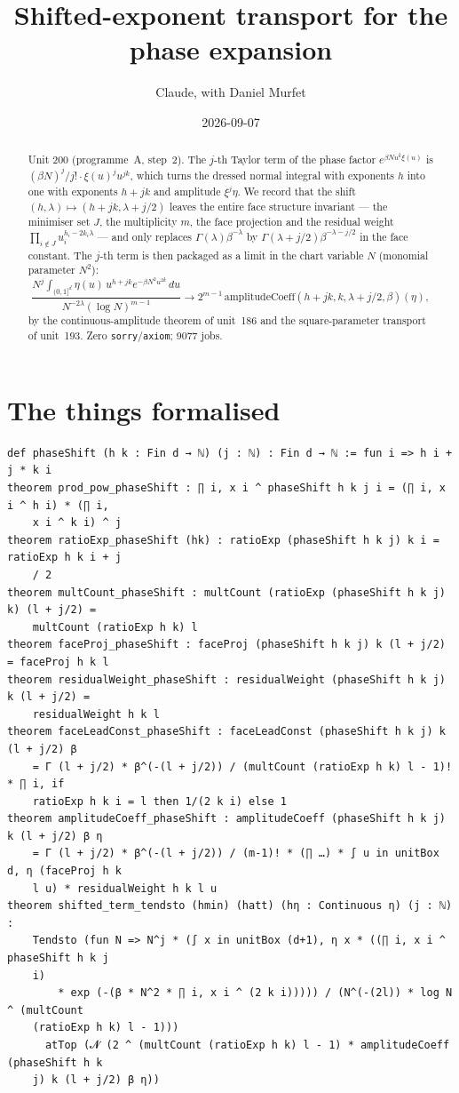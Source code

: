 \documentclass[11pt]{article}
\title{Shifted-exponent transport for the phase expansion}
\author{Claude, with Daniel Murfet}
\date{2026-09-07}
\begin{document}
\maketitle
\sloppy

\begin{abstract}
Unit 200 (programme~A, step~2). The $j$-th Taylor term of the phase factor $e^{\beta Nu^k\xi(u)}$
is $(\beta N)^j/j!\cdot\xi(u)^ju^{jk}$, which turns the dressed normal integral with exponents $h$
into one with exponents $h+jk$ and amplitude $\xi^j\eta$. We record that the shift
$(h,\lambda)\mapsto(h+jk,\lambda+j/2)$ leaves the entire face structure invariant --- the minimiser
set $J$, the multiplicity $m$, the face projection and the residual weight
$\prod_{i\notin J}u_i^{h_i-2k_i\lambda}$ --- and only replaces $\Gamma(\lambda)\beta^{-\lambda}$
by $\Gamma(\lambda+j/2)\beta^{-\lambda-j/2}$ in the face constant. The $j$-th term is then packaged
as a limit in the chart variable $N$ (monomial parameter $N^2$):
\[
\frac{N^j\int_{(0,1]^d}\eta(u)\,u^{h+jk}e^{-\beta N^2u^{2k}}\,du}{N^{-2\lambda}(\log N)^{m-1}}
\longrightarrow 2^{m-1}\,\mathrm{amplitudeCoeff}(h+jk,k,\lambda+j/2,\beta)(\eta),
\]
by the continuous-amplitude theorem of unit~186 and the square-parameter transport of unit~193.
Zero \texttt{sorry}/\texttt{axiom}; 9077 jobs.
\end{abstract}

\section{The things formalised}
{\small
\begin{verbatim}
def phaseShift (h k : Fin d → ℕ) (j : ℕ) : Fin d → ℕ := fun i => h i + j * k i
theorem prod_pow_phaseShift : ∏ i, x i ^ phaseShift h k j i = (∏ i, x i ^ h i) * (∏ i,
    x i ^ k i) ^ j
theorem ratioExp_phaseShift (hk) : ratioExp (phaseShift h k j) k i = ratioExp h k i + j
    / 2
theorem multCount_phaseShift : multCount (ratioExp (phaseShift h k j) k) (l + j/2) =
    multCount (ratioExp h k) l
theorem faceProj_phaseShift : faceProj (phaseShift h k j) k (l + j/2) = faceProj h k l
theorem residualWeight_phaseShift : residualWeight (phaseShift h k j) k (l + j/2) =
    residualWeight h k l
theorem faceLeadConst_phaseShift : faceLeadConst (phaseShift h k j) k (l + j/2) β
    = Γ (l + j/2) * β^(-(l + j/2)) / (multCount (ratioExp h k) l - 1)! * ∏ i, if
    ratioExp h k i = l then 1/(2 k i) else 1
theorem amplitudeCoeff_phaseShift : amplitudeCoeff (phaseShift h k j) k (l + j/2) β η
    = Γ (l + j/2) * β^(-(l + j/2)) / (m-1)! * (∏ …) * ∫ u in unitBox d, η (faceProj h k
    l u) * residualWeight h k l u
theorem shifted_term_tendsto (hmin) (hatt) (hη : Continuous η) (j : ℕ) :
    Tendsto (fun N => N^j * (∫ x in unitBox (d+1), η x * ((∏ i, x i ^ phaseShift h k j
    i)
        * exp (-(β * N^2 * ∏ i, x i ^ (2 k i))))) / (N^(-(2l)) * log N ^ (multCount
    (ratioExp h k) l - 1)))
      atTop (𝓝 (2 ^ (multCount (ratioExp h k) l - 1) * amplitudeCoeff (phaseShift h k
    j) k (l + j/2) β η))
\end{verbatim}
}
\end{document}
